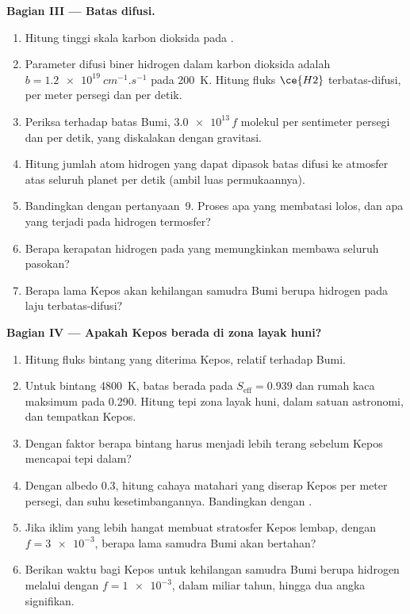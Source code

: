 \begin{problem}
\medskip\noindent\textbf{Bagian III --- Batas difusi.}
\begin{enumerate}[resume]
\item Hitung tinggi skala karbon dioksida pada .
\item Parameter difusi biner hidrogen dalam karbon dioksida adalah
  $b = \qty{1.2e19}{cm^{-1}.s^{-1}}$ pada \qty{200}{K}. Hitung
  fluks $\ce{H2}$ terbatas-difusi, per meter persegi dan per detik.
\item Periksa terhadap batas Bumi, $\num{3.0e13}\,f$ molekul per
  sentimeter persegi dan per detik, yang diskalakan dengan gravitasi.
\item Hitung jumlah atom hidrogen yang dapat dipasok batas difusi
  ke atmosfer atas seluruh planet per detik (ambil
  luas permukaannya).
\item Bandingkan dengan pertanyaan~9. Proses apa yang membatasi lolos, dan apa
  yang terjadi pada hidrogen termosfer?
\item Berapa kerapatan hidrogen pada  yang memungkinkan  membawa
  seluruh pasokan?
\item Berapa lama Kepos akan kehilangan samudra Bumi berupa hidrogen pada
  laju terbatas-difusi?
\end{enumerate}

\medskip\noindent\textbf{Bagian IV --- Apakah Kepos berada di zona layak huni?}
\begin{enumerate}[resume]
\item Hitung fluks bintang yang diterima Kepos, relatif terhadap Bumi.
\item Untuk bintang \qty{4800}{K}, batas  berada pada
  $S_\mathrm{eff} = 0.939$ dan rumah kaca maksimum pada 0.290. Hitung
  tepi zona layak huni, dalam satuan astronomi, dan tempatkan Kepos.
\item Dengan faktor berapa bintang harus menjadi lebih terang sebelum Kepos mencapai
  tepi dalam?
\item Dengan albedo 0.3, hitung cahaya matahari yang diserap Kepos per meter
  persegi, dan suhu kesetimbangannya. Bandingkan dengan .
\item Jika iklim yang lebih hangat membuat stratosfer Kepos lembap, dengan
  $f = \num{3e-3}$, berapa lama samudra Bumi akan bertahan?
\item Berikan waktu bagi Kepos untuk kehilangan samudra Bumi berupa hidrogen melalui
   dengan $f = \num{1e-3}$, dalam miliar tahun, hingga
  dua angka signifikan.
\end{enumerate}
\end{problem}
